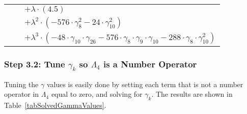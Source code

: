 \documentclass{article}
\begin{document}
\begin{table}[!hp]
\begin{center}
\begin{tabular}{rcl}
 & & $ + {\lambda}{\cdot}(4.5)$ \\
 & & $ + {\lambda}^2{\cdot}(-576{\cdot}{\gamma}_{8}^{2}-24{\cdot}{\gamma}_{10}^{2})$ \\
 & & $ + {\lambda}^3{\cdot}(-48{\cdot}{\gamma}_{10}{\cdot}{\gamma}_{26}-576{\cdot}{\gamma}_{8}{\cdot}{\gamma}_{9}{\cdot}{\gamma}_{10}-288{\cdot}{\gamma}_{8}{\cdot}{\gamma}_{10}^{2})$ \\
\end{tabular}
\end{center}
\end{table}

\subsubsection{Step 3.2: Tune $\gamma_{k}$ so $\Lambda_{4}$ is a Number Operator}

Tuning the $\gamma$ values is easily done by setting each term that is not a number operator in $\Lambda_{4}$ equal to zero, and solving for $\gamma_{k}$.  The results are shown in Table~\ref{tabSolvedGammaValues}.
\end{document}
